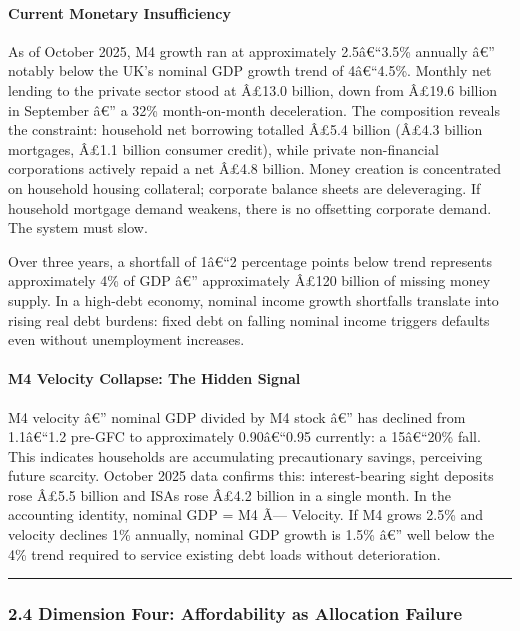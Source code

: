 \paragraph{Current Monetary
Insufficiency}\label{current-monetary-insufficiency}

As of October 2025, M4 growth ran at approximately 2.5â€``3.5\% annually
â€'' notably below the UK's nominal GDP growth trend of 4â€``4.5\%.
Monthly net lending to the private sector stood at Â£13.0 billion, down
from Â£19.6 billion in September â€'' a 32\% month-on-month
deceleration. The composition reveals the constraint: household net
borrowing totalled Â£5.4 billion (Â£4.3 billion mortgages, Â£1.1 billion
consumer credit), while private non-financial corporations actively
repaid a net Â£4.8 billion. Money creation is concentrated on household
housing collateral; corporate balance sheets are deleveraging. If
household mortgage demand weakens, there is no offsetting corporate
demand. The system must slow.

Over three years, a shortfall of 1â€``2 percentage points below trend
represents approximately 4\% of GDP â€'' approximately Â£120 billion of
missing money supply. In a high-debt economy, nominal income growth
shortfalls translate into rising real debt burdens: fixed debt on
falling nominal income triggers defaults even without unemployment
increases.

\paragraph{M4 Velocity Collapse: The Hidden
Signal}\label{m4-velocity-collapse-the-hidden-signal}

M4 velocity â€'' nominal GDP divided by M4 stock â€'' has declined from
1.1â€``1.2 pre-GFC to approximately 0.90â€``0.95 currently: a 15â€``20\%
fall. This indicates households are accumulating precautionary savings,
perceiving future scarcity. October 2025 data confirms this:
interest-bearing sight deposits rose Â£5.5 billion and ISAs rose Â£4.2
billion in a single month. In the accounting identity, nominal GDP = M4
Ã--- Velocity. If M4 grows 2.5\% and velocity declines 1\% annually,
nominal GDP growth is 1.5\% â€'' well below the 4\% trend required to
service existing debt loads without deterioration.

\begin{center}\rule{0.5\linewidth}{0.5pt}\end{center}

\subsubsection{2.4 Dimension Four: Affordability as Allocation
Failure}\label{dimension-four-affordability-as-allocation-failure}

